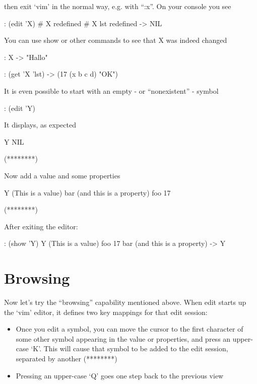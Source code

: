 then exit `vim' in the normal way, e.g. with ``:x''. On your console you
see


\begin{wideverbatim}
: (edit 'X)
# X redefined
# X lst redefined
-> NIL
\end{wideverbatim}

You can use show or other commands to see that X was indeed changed


\begin{wideverbatim}
: X
-> "Hallo"

: (get 'X 'lst)
-> (17 (x b c d) "OK")
\end{wideverbatim}

 It is even possible to start with an empty - or ``nonexistent'' - symbol


\begin{wideverbatim}
: (edit 'Y)
\end{wideverbatim}

It displays, as expected


\begin{wideverbatim}
Y NIL

(********)
\end{wideverbatim}

Now add a value and some properties


\begin{wideverbatim}
Y (This is a value)
   bar (and this is a property)
   foo 17

(********)
\end{wideverbatim}

After exiting the editor:


\begin{wideverbatim}
: (show 'Y)
Y (This is a value)
   foo 17
   bar (and this is a property)
-> Y
\end{wideverbatim}


\section{Browsing}
\label{sec:edit-browsing}


Now let's try the ``browsing'' capability mentioned above. When edit
starts up the `vim' editor, it defines two key mappings for that edit
session:

\begin{itemize}
\item Once you edit a symbol, you can move the cursor to the first
   character of some other symbol appearing in the value or properties,
   and press an upper-case `K'. This will cause that symbol to be added
   to the edit session, separated by another (********)
\item Pressing an upper-case `Q' goes one step back to the previous view
\end{itemize}

